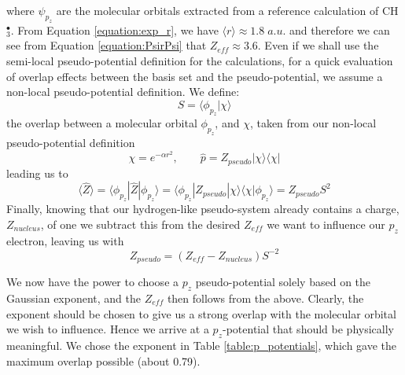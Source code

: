 \documentclass[journal=jctcce,manuscript=article]{achemso}
\begin{document}

 where \(\psi_{p_{z}}\) are the molecular orbitals extracted from a reference calculation of CH\(^{\bullet}_{3}\). From Equation \ref{equation:exp_r}, we have \( \langle r \rangle \approx 1.8\;a.u.\) and therefore we can see from Equation \ref{equation:PsirPsi} that \(Z_{eff} \approx 3.6\). Even if we shall use the semi-local pseudo-potential definition for the calculations, for a quick evaluation of overlap effects between the basis set and the pseudo-potential, we assume a non-local pseudo-potential definition. We define:
\begin{equation}
S = \langle \phi_{p_{z}} | \chi \rangle
\end{equation}
the overlap between a molecular orbital \(\phi_{p_{z}}\), and \(\chi\), taken from our non-local pseudo-potential definition \cite{huzinaga_effective_1991}
\begin{equation}
\chi = e^{-\alpha r^{2}},\qquad \widehat{p} = Z_{pseudo} | \chi \rangle \langle \chi |
\end{equation}
leading us to
\begin{equation}
\langle \widehat{Z} \rangle = \langle \phi_{p_{z}} | \widehat{Z} | \phi_{p_{z}} \rangle = \langle \phi_{p_{z}} | Z_{pseudo} | \chi \rangle \langle \chi | \phi_{p_{z}} \rangle = Z_{pseudo} S^{2}
\end{equation}
Finally, knowing that our hydrogen-like pseudo-system already contains a charge, \(Z_{nucleus}\), of one we subtract this from the desired \(Z_{eff}\) we want to influence our \(p_{z}\) electron, leaving us with
\begin{equation}
Z_{pseudo} = (Z_{eff} - Z_{nucleus})S^{-2}
\end{equation}

We now have the power to choose a \(p_{z}\) pseudo-potential solely based on the Gaussian exponent, and the \(Z_{eff}\) then follows from the above. Clearly, the exponent should be chosen to give us a strong overlap with the molecular orbital we wish to influence. Hence we arrive at a \(p_{z}\)-potential that should be physically meaningful. We chose the exponent in Table \ref{table:p_potentials}, which gave the maximum overlap possible (about 0.79).
\end{document}

